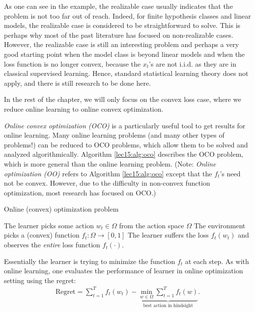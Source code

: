 As one can see in the example, the realizable case usually indicates that the problem is not too far out of reach. Indeed, for finite hypothesis classes and linear models, the realizable case is considered to be straightforward to solve. This is perhaps why most of the past literature has focused on non-realizable cases. However, the realizable case is still an interesting problem and perhaps a very good starting point when the model class is beyond linear models and when the loss function is no longer convex, because the $x_t$'s are not i.i.d. as they are in classical supervised learning. Hence, standard statistical learning theory does not apply, and there is still research to be done here.
 
In the rest of the chapter, we will only focus on the convex loss case, where we reduce online learning to online convex optimization. 
    

\textit{Online convex optimization (OCO)} is a particularly useful tool to get results for online learning. Many online learning problems (and many other types of problems!) can be reduced to OCO problems, which allow them to be solved and analyzed algorithmically. Algorithm \ref{lec15:alg:oco} describes the OCO problem, which is more general than the online learning problem. (Note: \textit{Online optimization (OO)} refers to Algorithm \ref{lec15:alg:oco} except that the $f_t$'s need not be convex. However, due to the difficulty in non-convex function optimization, most research has focused on OCO.)

    \begin{algorithm}\label{lec15:alg:oco}
    \caption{Online (convex) optimization problem}
     {
        The learner picks some action $w_t \in \Omega$ from the action space $\Omega$\;
        The environment picks a (convex) function $f_t: \Omega \to [0, 1]$\;
        The learner suffers the loss $f_t(w_t)$ and observes the \emph{entire} loss function $f_t(\cdot)$.
        }
    \end{algorithm}
    
Essentially the learner is trying to minimize the function $f_t$ at each step. As with online learning, one evaluates the performance of learner in online optimization setting using the regret:
\begin{align}
\text{Regret} = \sum_{t=1}^T f_t(w_t) - 
\underbrace{\min_{w \in \Omega} \sum_{t=1}^T f_t(w)}_\text{best action in hindsight}.
\end{align}

